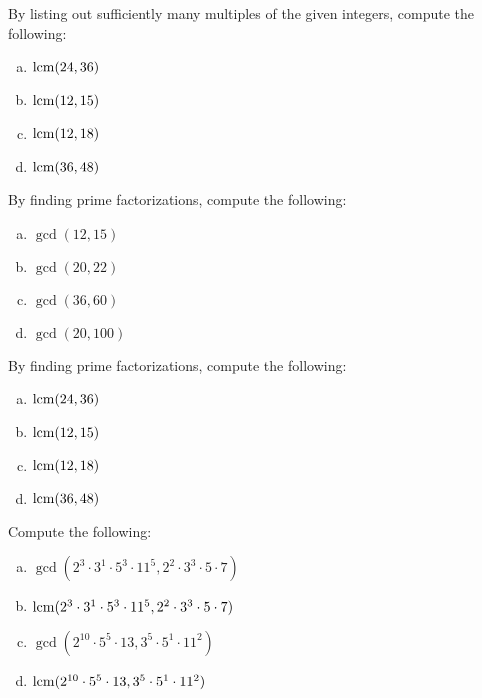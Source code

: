 \documentclass[11pt,letterpaper]{article}
\begin{document}
\newpage



 By listing out sufficiently many multiples of the given integers, compute the following:
	\begin{enumerate}[(a)]
	\item $\operatorname{lcm}(24, 36)$
	\item $\operatorname{lcm}(12, 15)$
	\item $\operatorname{lcm}(12, 18)$
	\item $\operatorname{lcm}(36, 48)$
	\end{enumerate}



\newpage



 By finding prime factorizations, compute the following:
	\begin{enumerate}[(a)]
	\item $\gcd(12, 15)$
	\item $\gcd(20, 22)$
	\item $\gcd(36, 60)$
	\item $\gcd(20, 100)$
	\end{enumerate}



\newpage



 By finding prime factorizations, compute the following:
	\begin{enumerate}[(a)]
	\item $\operatorname{lcm}(24, 36)$
	\item $\operatorname{lcm}(12, 15)$
	\item $\operatorname{lcm}(12, 18)$
	\item $\operatorname{lcm}(36, 48)$
	\end{enumerate}



\newpage



 Compute the following:
	\begin{enumerate}[(a)]
	\item $\gcd(2^3 \cdot 3^1 \cdot 5^3 \cdot 11^5, 2^2 \cdot 3^3 \cdot 5 \cdot 7)$
	\item $\operatorname{lcm}(2^3 \cdot 3^1 \cdot 5^3 \cdot 11^5, 2^2 \cdot 3^3 \cdot 5 \cdot 7)$
	\item $\gcd(2^{10} \cdot 5^5 \cdot 13, 3^5 \cdot 5^1 \cdot 11^2)$
	\item $\operatorname{lcm}(2^{10} \cdot 5^5 \cdot 13, 3^5 \cdot 5^1 \cdot 11^2)$
	\end{enumerate}
\end{document}
